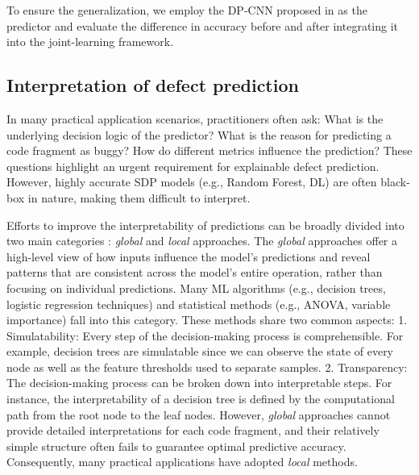 To ensure the generalization, we employ the DP-CNN proposed in \cite{30} as the predictor and evaluate the difference in accuracy before and after integrating it into the joint-learning framework.

\subsection{Interpretation of defect prediction}
In many practical application scenarios, practitioners often ask: What is the underlying decision logic of the predictor? What is the reason for predicting a code fragment as buggy? How do different metrics influence the prediction? These questions highlight an urgent requirement for explainable defect prediction. However, highly accurate SDP models (e.g., Random Forest, DL) are often black-box in nature, making them difficult to interpret.

Efforts to improve the interpretability of predictions can be broadly divided into two main categories \cite{murdoch2019definitions}: \textit{global} and \textit{local} approaches. The \textit{global} approaches offer a high-level view of how inputs influence the model’s predictions and reveal patterns that are consistent across the model’s entire operation, rather than focusing on individual predictions. Many ML algorithms (e.g., decision trees, logistic regression techniques) and statistical methods (e.g., ANOVA, variable importance) fall into this category\cite{31,32}. These methods share two common aspects: 1. Simulatability: Every step of the decision-making process is comprehensible. For example, decision trees are simulatable since we can observe the state of every node as well as the feature thresholds used to separate samples. 2. Transparency: The decision-making process can be broken down into interpretable steps. For instance, the interpretability of a decision tree is defined by the computational path from the root node to the leaf nodes.
However, \textit{global} approaches cannot provide detailed interpretations for each code fragment, and their relatively simple structure often fails to guarantee optimal predictive accuracy. Consequently, many practical applications have adopted \textit{local} methods.

